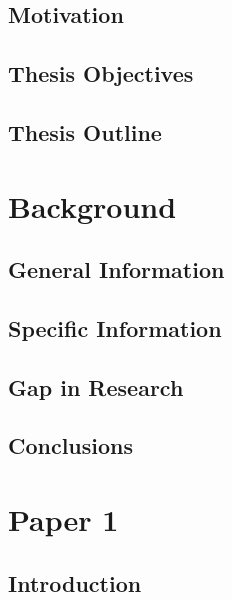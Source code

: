   \section{Motivation}\label{sec:Motivation}
    \lipsum[1-3]
  \section{Thesis Objectives}\label{sec:thesisObjective}
    \lipsum[14-16]
  \section{Thesis Outline}\label{sec:thesisOutline}
    \lipsum[17]


% 
                
\chapter{Background}\label{ch:Background}
  \section{General Information}\label{sec:generalInformation}
    \lipsum[23-25]
  \section{Specific Information}\label{sec:specificInformation}
    \lipsum[35-37]
  \section{Gap in Research}\label{sec:gapInResearch}
    \lipsum[42-43]
  \section{Conclusions}\label{sec:backgroundConclusions}
    \lipsum[12-13]

\chapter{Paper 1}\label{ch:Paper1}
  \section{Introduction}\label{sec:P1Introduction}
    \lipsum[34-36]

